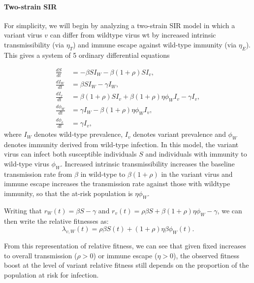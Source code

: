\documentclass[11pt,oneside,letterpaper]{article}
\newcommand{\wt}{W}
\newcommand{\varEscape}{\eta}
\newcommand{\varTransmission}{\rho}
\begin{document}
\paragraph{Two-strain SIR}%

For simplicity, we will begin by analyzing a two-strain SIR model in which a variant virus $v$ can differ from wildtype virus wt by increased intrinsic transmissibility (via $\varEscape_{T}$) and immune escape against wild-type immunity (via $\varEscape_{E}$).
This gives a system of 5 ordinary differential equations

\begin{align}
    \frac{d S}{d t} &= - \beta S I_{\wt} - \beta (1+\varTransmission) S I_{v},\\
    \frac{d I_{\wt}}{dt} &= \beta S I_{\wt} - \gamma I_{\wt},\\
    \frac{d I_{v}}{dt} &= \beta (1+\varTransmission) S I_{v} + \beta (1+\varTransmission) \varEscape \phi_{\wt} I_{v} - \gamma I_{v},\\
    \frac{d \phi_{\wt}}{dt} &= \gamma I_{\wt} - \beta (1+\varTransmission) \varEscape \phi_{\wt} I_{v},\\
    \frac{d \phi_{v}}{dt} &= \gamma I_{v},
\end{align}
where $I_{\wt}$ denotes wild-type prevalence, $I_{v}$ denotes variant prevalence and $\phi_{\wt}$ denotes immunity derived from wild-type infection.
In this model, the variant virus can infect both susceptible individuals $S$ and individuals with immunity to wild-type virus $\phi_{\wt}$.
Increased intrinsic transmissibility increases the baseline transmission rate from $\beta$ in wild-type to $\beta (1+\varTransmission)$ in the variant virus and immune escape increases the transmission rate against those with wildtype immunity, so that the at-risk population is $\varEscape \phi_{\wt}$.

Writing that $r_{\wt}(t) = \beta S - \gamma$ and $r_{v}(t) = \varTransmission \beta  S + \beta (1+\varTransmission) \varEscape \phi_{\wt} - \gamma$, we can then write the relative fitnesses as:
\begin{equation} \label{eq:two_strain_relative_fitness}
\lambda_{v,\wt}(t) = \varTransmission\beta S(t) + (1+\varTransmission) \varEscape \beta \phi_{\wt}(t).
\end{equation}

From this representation of relative fitness, we can see that given fixed increases to overall transmission ($\varTransmission > 0$) or immune escape ($\varEscape > 0$), the observed fitness boost at the level of variant relative fitness still depends on the proportion of the population at risk for infection.
\end{document}
